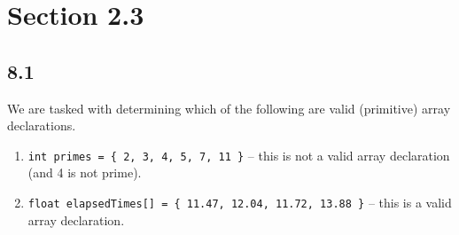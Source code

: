 \documentclass[leqno, 11pt]{article}
\begin{document}
\section*{Section 2.3}
\subsection*{8.1}
We are tasked with determining which of the following are valid (primitive) array declarations.
\begin{enumerate}[label=\alph*.]
  \item \texttt{int primes = \{ 2, 3, 4, 5, 7, 11 \}} -- this is not a valid array declaration (and 4 is not prime).
  \item \texttt{float elapsedTimes[] = \{ 11.47, 12.04, 11.72, 13.88 \}} -- this is a valid array declaration.
\end{enumerate}
\end{document}
